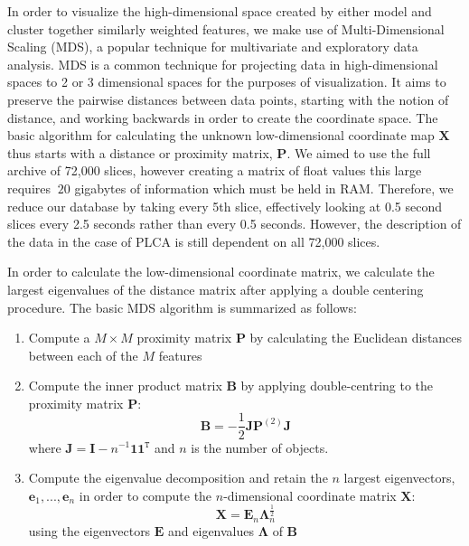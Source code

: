 In order to visualize the high-dimensional space created by either model and cluster together similarly weighted features, we make use of Multi-Dimensional Scaling (MDS), a popular technique for multivariate and exploratory data analysis. MDS is a common technique for projecting data in high-dimensional spaces to 2 or 3 dimensional spaces for the purposes of visualization.  It aims to preserve the pairwise distances between data points, starting with the notion of distance, and working backwards in order to create the coordinate space.  The basic algorithm for calculating the unknown low-dimensional coordinate map $\mathbf{X}$ thus starts with a distance or proximity matrix, $\mathbf{P}$.  We aimed to use the full archive of 72,000 slices, however creating a matrix of float values this large requires $~20$ gigabytes of information which must be held in RAM.  Therefore, we reduce our database by taking every 5th slice, effectively looking at 0.5 second slices every 2.5 seconds rather than every 0.5 seconds.  However, the description of the data in the case of PLCA is still dependent on all 72,000 slices.
  
In order to calculate the low-dimensional coordinate matrix, we calculate the largest eigenvalues of the distance matrix after applying a double centering procedure.  The basic MDS algorithm is summarized as follows:
\begin{enumerate}[noitemsep]
\item Compute a $M \times M$ proximity matrix $\mathbf{P}$ by calculating the Euclidean distances between each of the $M$ features
\item Compute the inner product matrix $\mathbf{B}$ by applying double-centring to the proximity matrix $\mathbf{P}$: 
\begin{equation}
\mathbf{B} = -\frac{1}{2}\mathbf{J}\mathbf{P}^{(2)}\mathbf{J}
\end{equation}
where $\mathbf{J} = \mathbf{I} - n^{-1}\mathbf{1}\mathbf{1^{\mathtt{T}}}$ and $n$ is the number of objects.
\item Compute the eigenvalue decomposition and retain the $n$ largest eigenvectors, $\mathbf{e}_1, ..., \mathbf{e}_n$ in order to compute the $n$-dimensional coordinate matrix $\mathbf{X}$:
\begin{equation}
\mathbf{X} = \mathbf{E}_n\mathbf{\Lambda}_n^{\frac{1}{2}}
\end{equation}
using the eigenvectors $\mathbf{E}$ and eigenvalues $\mathbf{\Lambda}$ of $\mathbf{B}$ 
\end{enumerate}

